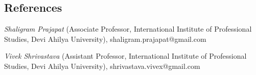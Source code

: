 \documentclass[margin,line]{resume}
\begin{document}
\begin{resume}
    \section{\mysidestyle References} 

    \begin{list2}
    \item {\sl Shaligram Prajapat} (Associate Professor, International Institute of Professional Studies, Devi Ahilya University), shaligram.prajapat@gmail.com
	\item {\sl Vivek Shrivastava} (Assistant Professor, International Institute of Professional Studies, Devi Ahilya University), shrivastava.vivex@gmail.com
    \end{list2}

\end{resume}
\end{document}
